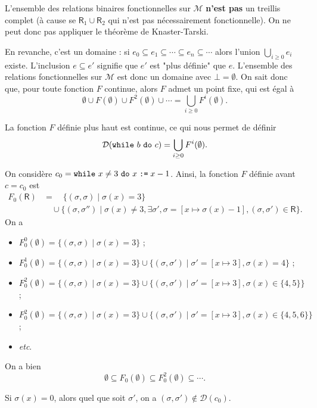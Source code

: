 \documentclass[../main]{subfiles}
\begin{document}
  L'ensemble des relations binaires fonctionnelles sur $\mathcal{M}$ \textbf{n'est pas} un treillis complet (à cause se $\mathsf{R}_1 \cup \mathsf{R}_2$ qui n'est pas nécessairement fonctionnelle).
  On ne peut donc pas appliquer le théorème de Knaster-Tarski.

  En revanche, c'est un domaine : si $e_0 \subseteq e_1 \subseteq \cdots \subseteq e_n \subseteq \cdots$ alors l'union $\bigcup_{i \ge 0} e_i$ existe.
  L'inclusion $e \subseteq e'$ signifie que $e'$ est "plus définie" que $e$.
  L'ensemble des relations fonctionnelles sur $\mathcal{M}$ est donc un domaine avec $\bot = \emptyset$.
  On sait donc que, pour toute fonction $F$ continue, alors $F$ admet un point fixe, qui est égal à \[
  \emptyset \cup F(\emptyset) \cup  F^2(\emptyset) \cup  \cdots = \bigcup_{i\ge 0} F^i(\emptyset)
  .\]

  La fonction $F$ définie plus haut est continue, ce qui nous permet de définir \[
  \mathcal{D}(\texttt{while}\ b\ \texttt{do}\ c) = \bigcup_{i \ge 0} F^i(\emptyset)
  .\]

  \begin{exm}
    On considère $c_0 = \texttt{while}\ x \neq 3\ \texttt{do}\ x \mathrel{\texttt{:=}} x - 1$.
    Ainsi, la fonction $F$ définie avant $c = c_0$ est
    \begin{align*}
      F_0(\mathsf{R}) &{}= \quad\{(\sigma, \sigma)  \mid \sigma(x) = 3\}\\
      &\quad\cup \{(\sigma, \sigma'')  \mid \sigma(x) \neq 3, \exists \sigma', \sigma = [x \mapsto \sigma(x) - 1], (\sigma,\sigma') \in \mathsf{R}\} 
    .\end{align*}
    On a 
    \begin{itemize}
      \item \footnotesize $F_0^0(\emptyset) = \{(\sigma, \sigma)  \mid \sigma(x) = 3\}$  ;
      \footnotesize\item $F_0^1(\emptyset) = \{(\sigma, \sigma)  \mid \sigma(x) = 3\} \cup \{(\sigma, \sigma')  \mid \sigma' = [x \mapsto 3], \sigma(x) = 4\} $ ;
      \item \footnotesize$F_0^2(\emptyset) = \{(\sigma, \sigma)  \mid \sigma(x) = 3\} \cup \{(\sigma, \sigma')  \mid \sigma' = [x \mapsto 3], \sigma(x) \in \{4,5\} \} $  ;
      \item \footnotesize$F_0^2(\emptyset) = \{(\sigma, \sigma)  \mid \sigma(x) = 3\} \cup \{(\sigma, \sigma')  \mid \sigma' = [x \mapsto 3], \sigma(x) \in \{4,5,6\} \} $ ;
      \item \textit{etc}.
    \end{itemize}
    On a bien \[
    \emptyset\subseteq F_0(\emptyset) \subseteq F^2_0(\emptyset) \subseteq \cdots 
    .\]

    Si $\sigma(x) = 0$, alors quel que soit $\sigma'$, on a $(\sigma, \sigma') \not\in \mathcal{D}(c_0)$.
  \end{exm}
\end{document}
